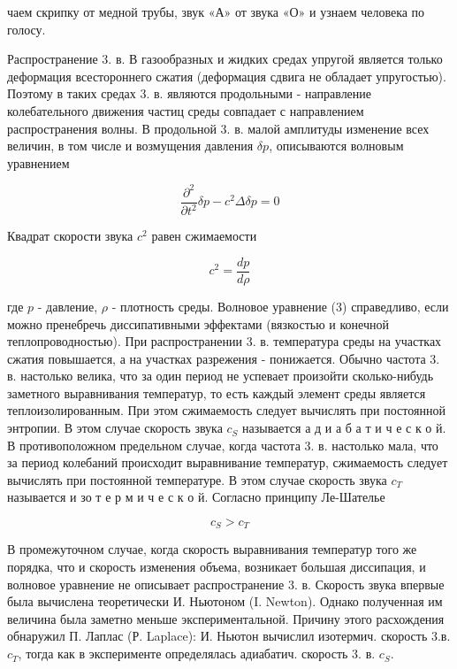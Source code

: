 \documentclass[10pt]{article}
\begin{document}
чаем скрипку от медной трубы, звук «А» от звука «О» и узнаем человека по голосу.



Распространение 3. в. В газообразных и жидких средах упругой является только деформация всестороннего сжатия (деформация сдвига не обладает упругостью). Поэтому в таких средах 3. в. являются продольными - направление колебательного движения частиц среды совпадает с направлением распространения волны. В продольной 3. в. малой амплитуды изменение всех величин, в том числе и возмущения давления $\delta p$, описываются волновым уравнением



\[

\frac{\partial^{2}}{\partial t^{2}} \delta p-c^{2} \Delta \delta p=0

\]



Квадрат скорости звука $c^{2}$ равен сжимаемости



\[

c^{2}=\frac{d p}{d \rho}

\]



где $p$ - давление, $\rho$ - плотность среды. Волновое уравнение (3) справедливо, если можно пренебречь диссипативными эффектами (вязкостью и конечной теплопроводностью). При распространении 3. в. температура среды на участках сжатия повышается, а на участках разрежения - понижается. Обычно частота 3. в. настолько велика, что за один период не успевает произойти сколько-нибудь заметного выравнивания температур, то есть каждый элемент среды является теплоизолированным. При этом сжимаемость следует вычислять при постоянной энтропии. В этом случае скорость звука $c_{S}$ называется а д и а б а т и ч е с к о й. В противоположном предельном случае, когда частота 3. в. настолько мала, что за период колебаний происходит выравнивание температур, сжимаемость следует вычислять при постоянной температуре. В этом случае скорость звука $c_{T}$ называется и зо т е р м и ч е с к о й. Согласно принципу Ле-Шателье



\[

c_{S}>c_{T}

\]



В промежуточном случае, когда скорость выравнивания температур того же порядка, что и скорость изменения объема, возникает большая диссипация, и волновое уравнение не описывает распространение 3. в. Скорость звука впервые была вычислена теоретически И. Ньютоном (I. Newton). Однако полученная им величина была заметно меньше экспериментальной. Причину этого расхождения обнаружил П. Лаплас (Р. Laplace): И. Ньютон вычислил изотермич. скорость 3.в. $c_{T}$, тогда как в эксперименте определялась адиабатич. скорость 3. в. $c_{S}$.
\end{document}
